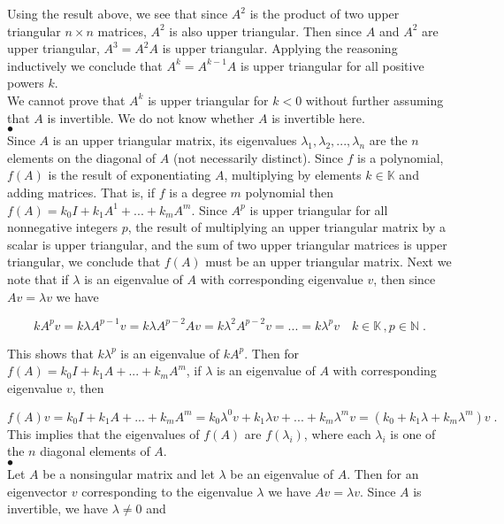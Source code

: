 \documentclass[11pt]{article}
\begin{document}
Using the result above, we see that since $A^2$ is the product of two upper triangular $n \times n$ matrices, $A^2$ is also upper triangular. Then since $A$ and $A^2$ are upper triangular, $A^3 = A^2A$ is upper triangular. Applying the reasoning inductively we conclude that $A^k = A^{k-1}A$ is upper triangular for all positive powers $k$. \\

We cannot prove that $A^k$ is upper triangular for $k < 0$ without further assuming that $A$ is invertible. We do not know whether $A$ is invertible here. \\

$\bullet$\\

Since $A$ is an upper triangular matrix, its eigenvalues $\lambda_1, \lambda_2, ...,\lambda_n$ are the $n$ elements on the diagonal of $A$ (not necessarily distinct). Since $f$ is a polynomial, $f(A)$ is the result of exponentiating $A$, multiplying by elements $k \in \mathbb{K}$ and adding matrices. That is, if $f$ is a degree $m$ polynomial then $f(A) = k_0I + k_1A^1 +...+k_mA^m$. Since $A^p$ is upper triangular for all nonnegative integers $p$, the result of multiplying an upper triangular matrix by a scalar is upper triangular, and the sum of two upper triangular matrices is upper triangular, we conclude that $f(A)$ must be an upper triangular matrix. Next we note that if $\lambda$ is an eigenvalue of $A$ with corresponding eigenvalue $v$, then since $Av = \lambda v$ we have

$$kA^pv = k\lambda A^{p-1}v = k\lambda A^{p-2}Av = k\lambda^2 A^{p-2}v = ... = k\lambda^p v \quad k \in \mathbb{K} \, ,p \in \mathbb{N} \;.$$

This shows that $k\lambda^p$ is an eigenvalue of $kA^p$. Then for $f(A) = k_0I + k_1A + ... + k_mA^m$, if $\lambda$ is an eigenvalue of $A$ with corresponding eigenvalue $v$, then

$$f(A)v = k_0I + k_1A+...+k_mA^m = k_0\lambda^0v + k_1\lambda v + ... +k_m \lambda^m v = (k_0 + k_1\lambda + k_m\lambda^m)v \;.$$ This implies that the eigenvalues of $f(A)$ are $f(\lambda_i)$, where each $\lambda_i$ is one of the $n$ diagonal elements of $A$.\\

$\bullet$\\

Let $A$ be a nonsingular matrix and let $\lambda$ be an eigenvalue of $A$. Then for an eigenvector $v$ corresponding to the eigenvalue $\lambda$ we have $Av = \lambda v$. Since $A$ is invertible, we have $\lambda \neq 0$ and
\end{document}
